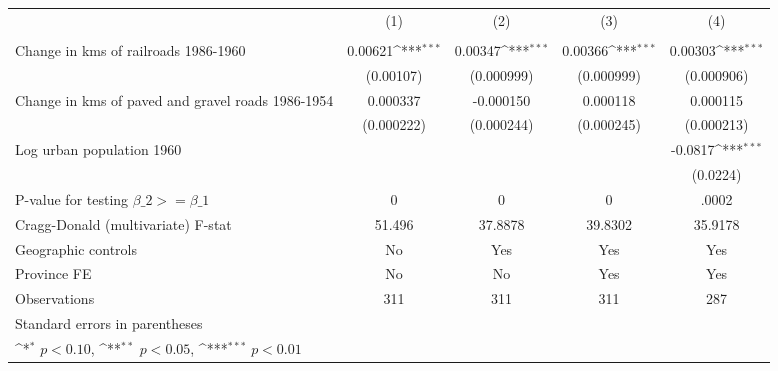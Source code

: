 {
\def\sym#1{\ifmmode^{#1}\else\(^{#1}\)\fi}
\begin{tabular}{l*{4}{c}}
\hline\hline
                &\multicolumn{1}{c}{(1)}&\multicolumn{1}{c}{(2)}&\multicolumn{1}{c}{(3)}&\multicolumn{1}{c}{(4)}\\
                &\multicolumn{1}{c}{}&\multicolumn{1}{c}{}&\multicolumn{1}{c}{}&\multicolumn{1}{c}{}\\
\hline
Change in kms of railroads 1986-1960&  0.00621\sym{***}&  0.00347\sym{***}&  0.00366\sym{***}&  0.00303\sym{***}\\
                &(0.00107)         &(0.000999)         &(0.000999)         &(0.000906)         \\
[1em]
Change in kms of paved and gravel roads 1986-1954& 0.000337         &-0.000150         & 0.000118         & 0.000115         \\
                &(0.000222)         &(0.000244)         &(0.000245)         &(0.000213)         \\
[1em]
Log urban population 1960&                  &                  &                  &  -0.0817\sym{***}\\
                &                  &                  &                  & (0.0224)         \\
\hline
P-value for testing $\beta\_{2} >= \beta\_{1}$&        0         &        0         &        0         &    .0002         \\
Cragg-Donald (multivariate) F-stat&   51.496         &  37.8878         &  39.8302         &  35.9178         \\
Geographic controls&       No         &      Yes         &      Yes         &      Yes         \\
Province FE     &       No         &       No         &      Yes         &      Yes         \\
Observations    &      311         &      311         &      311         &      287         \\
\hline\hline
\multicolumn{5}{l}{\footnotesize Standard errors in parentheses}\\
\multicolumn{5}{l}{\footnotesize \sym{*} \(p<0.10\), \sym{**} \(p<0.05\), \sym{***} \(p<0.01\)}\\
\end{tabular}
}
